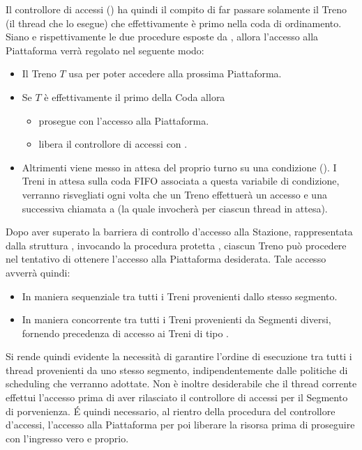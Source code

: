 \begin{description}
		Il controllore di accessi () ha quindi il compito di far passare solamente il Treno (il thread che lo esegue) che effettivamente è primo nella coda di ordinamento.
		Siano  e  rispettivamente le due procedure esposte da , allora l'accesso alla Piattaforma verrà regolato nel seguente modo:
			\begin{itemize}
				\item Il Treno $T$ usa  per poter accedere alla prossima Piattaforma.
				\item Se $T$ è effettivamente il primo della Coda allora 
					\begin{itemize}
						\item prosegue con l'accesso alla Piattaforma. 
						\item libera il controllore di accessi  con . 
					\end {itemize}
				\item Altrimenti viene messo in attesa del proprio turno su una condizione (). I Treni in attesa sulla coda FIFO associata a questa variabile di condizione, verranno risvegliati ogni volta che un Treno effettuerà un accesso e una successiva chiamata a  (la quale invocherà  per ciascun thread in attesa).
			\end{itemize}
		
		
		\item{}
		
		Dopo aver superato la barriera di controllo d'accesso alla Stazione, rappresentata dalla struttura , invocando la procedura protetta , ciascun Treno può procedere nel tentativo di ottenere l'accesso alla Piattaforma desiderata. Tale accesso avverrà quindi:
		
		\begin{itemize}
			\item In maniera sequenziale tra tutti i Treni provenienti dallo stesso segmento.
			\item In maniera concorrente tra tutti i Treni provenienti da Segmenti diversi, fornendo precedenza di accesso ai Treni di tipo .
		\end{itemize}
		
		Si rende quindi evidente la necessità di garantire l'ordine di esecuzione tra tutti i thread provenienti da uno stesso segmento, indipendentemente dalle politiche di scheduling che verranno adottate. Non è inoltre desiderabile che il thread corrente effettui l'accesso prima di aver rilasciato il controllore di accessi per il Segmento di porvenienza. \'E quindi necessario, al rientro della procedura  del controllore d'accessi,  l'accesso alla Piattaforma per poi liberare la risorsa  prima di proseguire con l'ingresso vero e proprio.
				  

\end{description}

